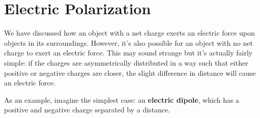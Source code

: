 \chapter{Electric Polarization}

We have discussed how an object with a net charge
exerts an electric force upon objects in its surroundings.
However, it's also possible for an object with no net charge
to exert an electric force.
This may sound strange but it's actually fairly simple:
if the charges are asymmetrically distributed
in a way such that either positive or negative charges are closer,
the slight difference in distance will cause an electric force.

As an example, imagine the simplest case:
an \textbf{electric dipole},
which has a positive and negative charge separated by a distance.
